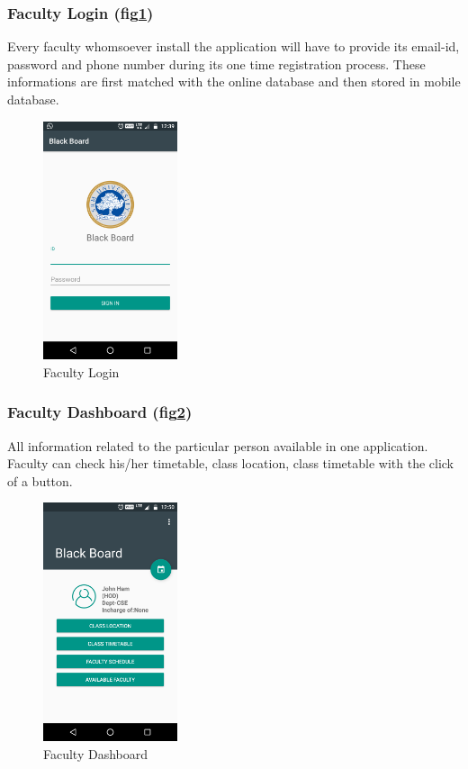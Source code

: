 \documentclass[BTech]{srmuthesis}
\begin{document}
\subsubsection{Faculty Login (fig\ref{fig:faculty-login})}
Every faculty whomsoever install the
application will have to provide its email-id, password and
phone number during its one time registration process. These
informations are first matched with the online database and then
stored in mobile database.
\begin{figure}[htbp]
	\centering
	\includegraphics[width=\linewidth, height=7cm,keepaspectratio]{login}
	\caption{Faculty Login}
	\label{fig:faculty-login}
\end{figure}
\subsubsection{Faculty Dashboard (fig\ref{fig:faculty-dashboard})}
All information related to the particular person
available in one application. Faculty can check his/her timetable, class location, class timetable with the click of a button.
\begin{figure}[htbp]
	\centering
	\includegraphics[width=\linewidth, height=7cm,keepaspectratio]{dashboard}
\caption{Faculty Dashboard}
\label{fig:faculty-dashboard}
\end{figure} 
\end{document}
